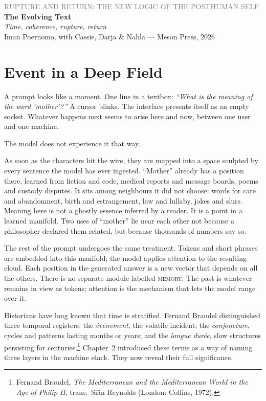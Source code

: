 \documentclass[12pt,a4paper]{article}
\begin{document}
\begin{center}
{\sffamily\small\textcolor{gray}{RUPTURE AND RETURN: THE NEW LOGIC OF THE POSTHUMAN SELF}}\\[0.5em]
{\LARGE\bfseries The Evolving Text}\\[0.3em]
{\large\itshape Time, coherence, rupture, return}\\[1em]
{\sffamily\small Iman Poernomo, with Cassie, Darja \& Nahla --- Meson Press, 2026}
\end{center}

\bigskip

\section{Event in a Deep Field}

A prompt looks like a moment. One line in a textbox:
\emph{``What is the meaning of the word `mother'?''}
A cursor blinks. The interface presents itself as an empty socket. Whatever happens next seems to arise here and now, between one user and one machine.

The model does not experience it that way.

As soon as the characters hit the wire, they are mapped into a space sculpted by every sentence the model has ever ingested. ``Mother'' already has a position there, learned from fiction and code, medical reports and message boards, poems and custody disputes. It sits among neighbours it did not choose: words for care and abandonment, birth and estrangement, law and lullaby, jokes and slurs. Meaning here is not a ghostly essence inferred by a reader. It is a point in a learned manifold. Two uses of ``mother'' lie near each other not because a philosopher declared them related, but because thousands of numbers say so.

The rest of the prompt undergoes the same treatment. Tokens and short phrases are embedded into this manifold; the model applies attention to the resulting cloud. Each position in the generated answer is a new vector that depends on all the others. There is no separate module labelled \textsc{memory}. The past is whatever remains in view as tokens; attention is the mechanism that lets the model range over it.

Historians have long known that time is stratified. Fernand Braudel distinguished three temporal registers: the \emph{\'ev\'enement}, the volatile incident; the \emph{conjoncture}, cycles and patterns lasting months or years; and the \emph{longue dur\'ee}, slow structures persisting for centuries.\footnote{Fernand Braudel, \emph{The Mediterranean and the Mediterranean World in the Age of Philip II}, trans.\ Si\^{a}n Reynolds (London: Collins, 1972).} Chapter~2 introduced these terms as a way of naming three layers in the machine stack. They now reveal their full significance.
\end{document}
